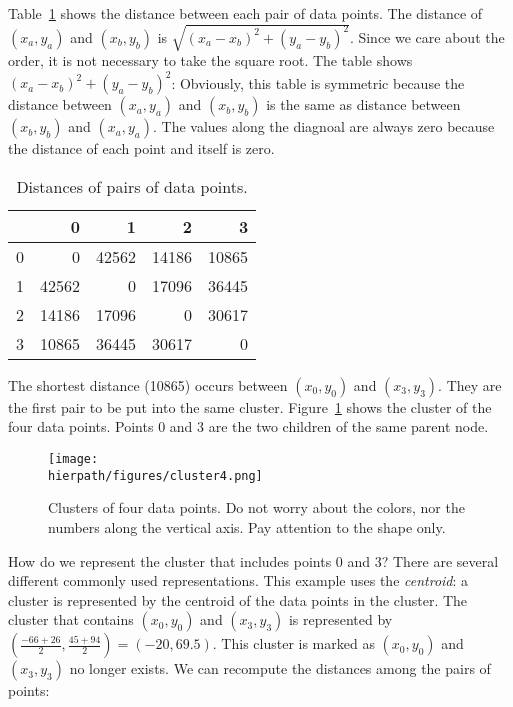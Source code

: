 Table~\ref{table:hierarchical:distance4points} shows the distance
between each pair of data points.  The distance of $(x_a, y_a)$ and
$(x_b, y_b)$ is $\sqrt{(x_a - x_b)^2 + (y_a - y_b)^2}$. Since we care
about the order, it is not necessary to take the square root.
The
table shows ${(x_a - x_b)^2 + (y_a - y_b)^2}$:
Obviously, this table is symmetric because the distance between $(x_a,
y_a)$ and $(x_b, y_b)$ is the same as distance between $(x_b, y_b)$
and $(x_a, y_a)$. The values along the diagnoal are always zero
because the distance of each point and itself is zero.

\begin{table}
  \begin{tt}
\begin{tabular}{|r|rrrr|}  \hline
& 0 & 1 & 2 & 3  \\ \hline

0 & 0& 42562& 14186& 10865\\
1 & 42562& 0& 17096& 36445\\
2 & 14186& 17096& 0& 30617\\
3 & 10865& 36445& 30617& 0\\ \hline
\end{tabular}
  \end{tt}
  \caption{Distances of pairs of data points.}
  \label{table:hierarchical:distance4points}
\end{table}

The shortest distance (10865) occurs between $(x_0, y_0)$ and $(x_3,
y_3)$.  They are the first pair to be put into the same cluster.
Figure~\ref{fig:hierarchical:cluster4} shows 
the cluster of the four data points. Points 0 and 3 are the two
children of the same parent node. 

\begin{figure}[h] \centering
{\texttt{[image: \\hierpath/figures/cluster4.png]}}
\caption{Clusters of four data points.
Do not worry about the colors, nor the numbers along the vertical
axis. Pay attention to the shape only.
}
\label{fig:hierarchical:cluster4}
\end{figure}

How do we represent the cluster that includes points 0 and 3?  There
are several different commonly used representations.  This example
uses the {\it centroid}: a cluster is represented by the centroid of
the data points in the cluster.  The cluster that contains $(x_0,
y_0)$ and $(x_3, y_3)$ is represented by $(\frac{-66+26}{2},
\frac{45+94}{2}) = (-20, 69.5)$.  This cluster is marked as $(x_0,
y_0)$ and $(x_3, y_3)$ no longer exists.  We can recompute the
distances among the pairs of points:


